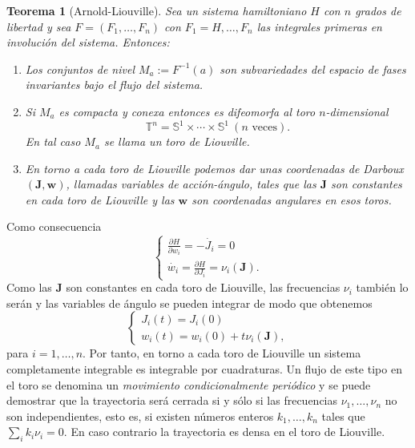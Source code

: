 \documentclass[12pt,a4paper,twoside]{article}
\newtheorem{thm}{Teorema}[section]
\theoremstyle{definition} \newtheorem{defn}[thm]{Definición}
\theoremstyle{definition} \newtheorem{ejemplo}[thm]{Ejemplo}
\theoremstyle{definition} \newtheorem{ejercicio}[thm]{Ejercicio}
\theoremstyle{remark} \newtheorem*{obs}{Observación}
\def\TT{\mathbb{T}}
\newcommand{\vect}[1]{\mathbf{#1}}
\begin{document}
  \begin{thm}[Arnold-Liouville]\label{arnoldliouville}
   Sea un sistema hamiltoniano $H$ con $n$ grados de libertad y sea $F=(F_1,\dots,F_n)$ con $F_1=H,\dots,F_n$ las integrales primeras en involución del sistema. Entonces:
   \begin{enumerate}
     \item Los conjuntos de nivel $M_a:=F^{-1}(a)$ son subvariedades del espacio de fases invariantes bajo el flujo del sistema.
     \item Si $M_a$ es compacta y conexa entonces es difeomorfa al toro $n$-dimensional
       \begin{equation*}
	 \TT^n=\mathbb{S} ^1 \times \cdots \times \mathbb{S}^1 \ (n \text{ veces}).
       \end{equation*}
       En tal caso $M_a$ se llama un \emph{toro de Liouville}.
     \item En torno a cada toro de Liouville podemos dar unas coordenadas de Darboux $(\vect{J},\vect{w})$, llamadas \emph{variables de acción-ángulo}, tales que las $\vect{J}$ son constantes en cada toro de Liouville y las $\vect{w}$ son coordenadas angulares en esos toros. 
   \end{enumerate}
  \end{thm}
  Como consecuencia
       \begin{equation}
	 \begin{cases}
	   \frac{\partial H}{\partial w_i}=-\dot{J_i}=0 \\
	   \dot{w_i}=\frac{\partial H}{\partial J_i}=\nu_i(\vect{J}). 
	 \end{cases}
       \end{equation}
       Como las $\vect{J}$ son constantes en cada toro de Liouville, las frecuencias $\nu_i$ también lo serán y las variables de ángulo se pueden integrar de modo que obtenemos
       \begin{equation}
	 \begin{cases}
	  J_i(t)=J_i(0) \\
	 w_i(t)=w_i(0)+t \nu_i(\vect{J}),
	 \end{cases}
       \end{equation}
       para $i=1,\dots,n$.
       Por tanto, en torno a cada toro de Liouville un sistema completamente integrable es integrable por cuadraturas. Un flujo de este tipo en el toro se denomina un \emph{movimiento condicionalmente periódico} y se puede demostrar \cite{arnold} que la trayectoria será cerrada si y sólo si las frecuencias $\nu_1,\dots,\nu_n$ no son independientes, esto es, si existen números enteros $k_1,\dots,k_n$ tales que $\sum_i k_i\nu_i=0$. En caso contrario la trayectoria es densa en el toro de Liouville.
\end{document}
